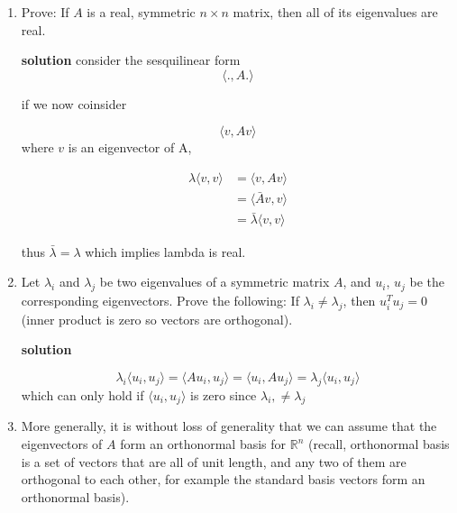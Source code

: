 \documentclass{article}
\newcommand{\sol}{\textbf{solution}}
\begin{document}
\begin{enumerate}
    \item Prove: If $A$ is a real, symmetric $n \times n$ matrix, then all of its eigenvalues are real.
    
    \sol 
    consider the sesquilinear  form 
    \begin{equation}
        \langle .,A.\rangle
    \end{equation}

    if we now coinsider 

    \begin{equation}
        \langle v,Av\rangle 
    \end{equation}
    where \(v\) is an eigenvector of A,

    \begin{equation}
        \begin{split}
        \lambda \langle v,v\rangle &= \langle v,Av\rangle\\
        &= \langle \bar A v,v\rangle \\
        &= \bar \lambda\langle  v,v\rangle 
        \end{split}
    \end{equation}

    thus \(\bar \lambda = \lambda\) which implies lambda is real. 



    \item Let $\lambda_i$ and $\lambda_j$ be two eigenvalues of a symmetric matrix $A$, and $u_i$, $u_j$ be the corresponding eigenvectors. Prove the following: If $\lambda_i \neq \lambda_j$, then
$u_i^Tu_j  = 0$ (inner product is zero so vectors are orthogonal).

\sol

    \begin{equation}
        \lambda_i\langle u_i, u_j\rangle =\langle Au_i, u_j\rangle =\langle u_i, A u_j\rangle = \lambda_j\langle u_i, u_j\rangle 
    \end{equation}
    which can only hold if \(\langle u_i,u_j\rangle\) is zero since \(\lambda_i,\neq \lambda_j\)
    \item More generally, it is without loss of generality that we can assume that the eigenvectors of $A$ form an orthonormal basis for $\mathbb{R}^n$ (recall, orthonormal basis is a set of vectors that are all of unit length, and any two of them are orthogonal to each other, for example the standard basis vectors form an orthonormal basis).
    

\end{enumerate}
\end{document}
